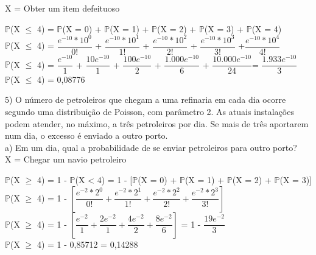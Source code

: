 \documentclass[12pt,a4paper]{article}
\begin{document}
	X = Obter um item defeituoso
	\begin{center}
		\vspace{0.5cm}
		$\mathbb{P}$(X $\leq$ 4) = $\mathbb{P}$(X = 0) + $\mathbb{P}$(X = 1) + $\mathbb{P}$(X = 2) + $\mathbb{P}$(X = 3) + $\mathbb{P}$(X = 4)
		\vspace{0.5cm}\\
		$\mathbb{P}$(X $\leq$ 4) = $\dfrac{e^{-10} * 10^{0}}{0!}$ + $\dfrac{e^{-10} * 10^{1}}{1!}$ + $\dfrac{e^{-10} * 10^{2}}{2!}$ + $\dfrac{e^{-10} * 10^{3}}{3!}$ +$\dfrac{e^{-10} * 10^{4}}{4!}$
		\vspace{0.5cm}\\
		$\mathbb{P}$(X $\leq$ 4) = $\dfrac{e^{-10}}{1}$ + $\dfrac{10e^{-10}}{1}$ + $\dfrac{100e^{-10}}{2}$ + $\dfrac{1.000e^{-10}}{6}$ + $\dfrac{10.000e^{-10}}{24}$= $\dfrac{1.933e^{-10}}{3}$
		\vspace{0.5cm}\\
		$\mathbb{P}$(X $\leq$ 4) = 0,08776
	\end{center}
	\vspace{1cm}
	5) O número de petroleiros que chegam a uma refinaria em cada dia ocorre segundo uma distribuição de Poisson, com parâmetro 2. As atuais instalações podem atender, no máximo, a três petroleiros por dia. Se mais de três aportarem num dia, o excesso é enviado a outro porto.\\
	a) Em um dia, qual a probabilidade de se enviar petroleiros para outro porto?
	\vspace{0.5cm}\\
	X = Chegar um navio petroleiro
	\begin{center}
		\vspace{0.5cm}
		$\mathbb{P}$(X $\geq$ 4) = 1 - $\mathbb{P}$(X < 4) = 1 - [$\mathbb{P}$(X = 0) + $\mathbb{P}$(X = 1) + $\mathbb{P}$(X = 2) + $\mathbb{P}$(X = 3)]
		\vspace{0.5cm}\\
		$\mathbb{P}$(X $\geq$ 4) = 1 - $\left[\dfrac{e^{-2} * 2^0}{0!} + \dfrac{e^{-2} * 2^1}{1!} + \dfrac{e^{-2} * 2^2}{2!} + \dfrac{e^{-2} * 2^3}{3!}\right]$
		\vspace{0.5cm}\\
		$\mathbb{P}$(X $\geq$ 4) = 1 - $\left[\dfrac{e^{-2}}{1} + \dfrac{2e^{-2}}{1} + \dfrac{4e^{-2}}{2} + \dfrac{8e^{-2}}{6}\right]$ = 1 - $\dfrac{19e^{-2}}{3}$
		\vspace{0.5cm}\\
		$\mathbb{P}$(X $\geq$ 4) = 1 - 0,85712 = 0,14288
	\end{center}
	\vspace{1cm}
\end{document}
